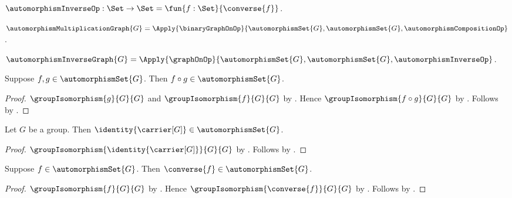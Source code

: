 \begin{definition}\label{automorphism_inverse_op}
    $\automorphismInverseOp:\Set\to\Set
        =\fun{f:\Set}{\converse{f}}$.
\end{definition}

\begin{definition}\label{automorphism_multiplication_graph}
    $\automorphismMultiplicationGraph{G}=
        \Apply{\binaryGraphOnOp}
            {\automorphismSet{G},\automorphismSet{G},\automorphismCompositionOp}$.
\end{definition}

\begin{definition}\label{automorphism_inverse_graph}
    $\automorphismInverseGraph{G}=
        \Apply{\graphOnOp}
            {\automorphismSet{G},\automorphismSet{G},\automorphismInverseOp}$.
\end{definition}

\begin{proposition}\label{automorphism_composition_closed}
    Suppose $f,g\in\automorphismSet{G}$.
    Then $f\circ g\in\automorphismSet{G}$.
\end{proposition}
\begin{proof}
    $\groupIsomorphism{g}{G}{G}$ and
        $\groupIsomorphism{f}{G}{G}$ by
        .
    Hence $\groupIsomorphism{f\circ g}{G}{G}$ by
        .
    Follows by .
\end{proof}

\begin{proposition}\label{automorphism_identity_closed}
    Let $G$ be a group.
    Then $\identity{\carrier[G]}\in\automorphismSet{G}$.
\end{proposition}
\begin{proof}
    $\groupIsomorphism{\identity{\carrier[G]}}{G}{G}$ by
        .
    Follows by .
\end{proof}

\begin{proposition}\label{automorphism_inverse_closed}
    Suppose $f\in\automorphismSet{G}$.
    Then $\converse{f}\in\automorphismSet{G}$.
\end{proposition}
\begin{proof}
    $\groupIsomorphism{f}{G}{G}$ by
        .
    Hence $\groupIsomorphism{\converse{f}}{G}{G}$ by
        .
    Follows by .
\end{proof}

